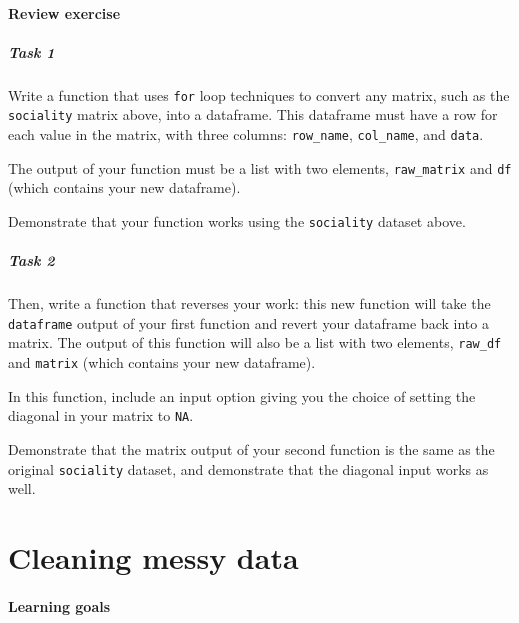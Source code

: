 \documentclass[
]{book}
\begin{document}
\hypertarget{review-exercise-5}{%
\subsubsection*{Review exercise}\label{review-exercise-5}}

\hypertarget{task-1-2}{%
\paragraph{Task 1}\label{task-1-2}}

Write a function that uses \texttt{for} loop techniques to convert any matrix, such as the \texttt{sociality} matrix above, into a dataframe. This dataframe must have a row for each value in the matrix, with three columns: \texttt{row\_name}, \texttt{col\_name}, and \texttt{data}.

The output of your function must be a list with two elements, \texttt{raw\_matrix} and \texttt{df} (which contains your new dataframe).

Demonstrate that your function works using the \texttt{sociality} dataset above.

\hypertarget{task-2-2}{%
\paragraph{Task 2}\label{task-2-2}}

Then, write a function that reverses your work: this new function will take the \texttt{dataframe} output of your first function and revert your dataframe back into a matrix. The output of this function will also be a list with two elements, \texttt{raw\_df} and \texttt{matrix} (which contains your new dataframe).

In this function, include an input option giving you the choice of setting the diagonal in your matrix to \texttt{NA}.

Demonstrate that the matrix output of your second function is the same as the original \texttt{sociality} dataset, and demonstrate that the diagonal input works as well.

\hypertarget{cleaning-messy-data}{%
\chapter{Cleaning messy data}\label{cleaning-messy-data}}

\hypertarget{learning-goals-21}{%
\subsubsection*{Learning goals}\label{learning-goals-21}}
\end{document}
